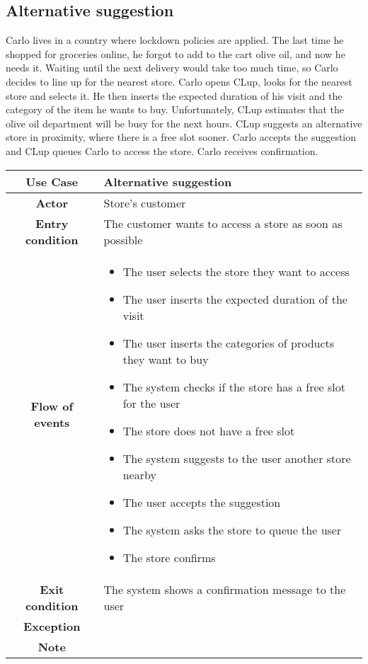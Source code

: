 \documentclass[../../main.tex]{subfiles}
\begin{document}
    \subsection*{Alternative suggestion}

    Carlo lives in a country where lockdown policies are applied. The last time he shopped for groceries online, 
    he forgot to add to the cart olive oil, and now he needs it. Waiting until the next delivery would take too much time, 
    so Carlo decides to line up for the nearest store. 
    Carlo opens CLup, looks for the nearest store and selects it. 
    He then inserts the expected duration of his visit and the category of the item he wants to buy. 
    Unfortunately, CLup estimates that the olive oil department will be busy for the next hours. 
    CLup suggests an alternative store in proximity, where there is a free slot sooner. 
    Carlo accepts the suggestion and CLup queues Carlo to access the store. Carlo receives confirmation.

    \begin{table}[H]
      \centering
        \begin{tabular}{c m{}}
        \hline
        \textbf{Use Case} & Alternative suggestion\\ \hline
        \textbf{Actor} & Store's customer\\ \hline
        \textbf{Entry condition} & The customer wants to access a store as soon as possible\\  \hline
        \textbf{Flow of events} & \begin{itemize}
                                    \item The user selects the store they want to access
                                    \item The user inserts the expected duration of the visit
                                    \item The user inserts the categories of products they want to buy
                                    \item The system checks if the store has a free slot for the user
                                    \item The store does not have a free slot
                                    \item The system suggests to the user another store nearby
                                    \item The user accepts the suggestion
                                    \item The system asks the store to queue the user
                                    \item The store confirms
                                  \end{itemize}\\ \hline
        \textbf{Exit condition} & The system shows a confirmation message to the user \\ \hline
        \textbf{Exception} & \\ \hline
        \textbf{Note} & \\ \hline
        \end{tabular}
        \end{table}
\end{document}
